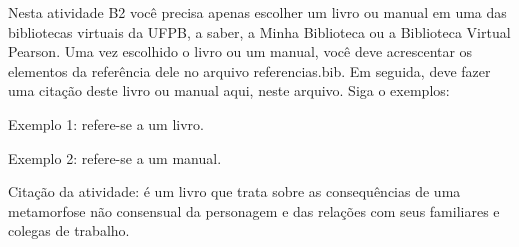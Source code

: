 \documentclass[12pt]{article}
\begin{document}
Nesta atividade B2 você precisa apenas escolher um livro ou manual em uma das bibliotecas virtuais da UFPB, a saber, a Minha Biblioteca ou a Biblioteca Virtual Pearson. Uma vez escolhido o livro ou um manual, você deve acrescentar os elementos da referência dele no arquivo referencias.bib. Em seguida, deve fazer uma citação deste livro ou manual aqui, neste arquivo. Siga o exemplos:\\
\par Exemplo 1: \cite{SILVA2020} refere-se a um livro.\\
\par Exemplo 2: \cite{NBR10520:1988} refere-se a um manual.\\

\par Citação da atividade: \cite{kfk} é um livro que trata sobre as consequências de uma metamorfose não consensual da personagem e das relações com seus familiares e colegas de trabalho.


\end{document}
